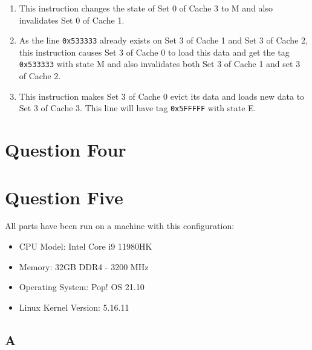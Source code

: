 \documentclass[12pt]{article}
\begin{document}
\begin{enumerate}[label=\alph*.]
\begin{enumerate}[label=\arabic*.]
	\item This instruction changes the state of Set 0 of Cache 3 to M and also invalidates Set 0 of Cache 1.
	
	\item
	As the line \Verb+0x533333+ already exists on Set 3 of Cache 1 and Set 3 of Cache 2, this instruction causes Set 3 of Cache 0 to load this data and get the tag \Verb+0x533333+ with state M and also invalidates both Set 3 of Cache 1 and set 3 of Cache 2.
	
	\item
	This instruction makes Set 3 of Cache 0 evict its data and loads new data to Set 3 of Cache 3. This line will have tag \Verb+0x5FFFFF+ with state E.
\end{enumerate}

\end{enumerate}
	
	\newpage
	
	
	\section{Question Four}
	
	
	
	\newpage
	
	
	\section{Question Five}
	
	All parts have been run on a machine with this configuration:
	
	\begin{itemize}
		\item CPU Model: Intel Core i9 11980HK
		\item Memory: 32GB DDR4 - 3200 MHz
		\item Operating System: Pop! OS 21.10
		\item Linux Kernel Version: 5.16.11
	\end{itemize}
	
	\subsection{A}
	
\end{document}
